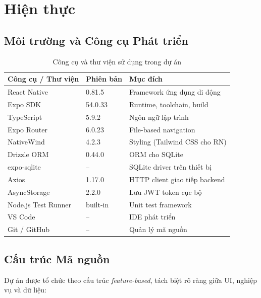 \chapter{Hiện thực}
\label{chap:implementation}

\section{Môi trường và Công cụ Phát triển}
\label{sec:impl-env}

\begin{table}[H]
  \centering
  \caption{Công cụ và thư viện sử dụng trong dự án}
  \label{tab:impl-tools}
  \begin{tabular}{lll}
    \toprule
    \textbf{Công cụ / Thư viện} & \textbf{Phiên bản} & \textbf{Mục đích} \\
    \midrule
    React Native         & 0.81.5  & Framework ứng dụng di động \\
    Expo SDK             & 54.0.33 & Runtime, toolchain, build \\
    TypeScript           & 5.9.2   & Ngôn ngữ lập trình \\
    Expo Router          & 6.0.23  & File-based navigation \\
    NativeWind           & 4.2.3   & Styling (Tailwind CSS cho RN) \\
    Drizzle ORM          & 0.44.0  & ORM cho SQLite \\
    expo-sqlite          & --      & SQLite driver trên thiết bị \\
    Axios                & 1.17.0  & HTTP client giao tiếp backend \\
    AsyncStorage         & 2.2.0   & Lưu JWT token cục bộ \\
    Node.js Test Runner  & built-in & Unit test framework \\
    VS Code              & --      & IDE phát triển \\
    Git / GitHub         & --      & Quản lý mã nguồn \\
    \bottomrule
  \end{tabular}
\end{table}

\section{Cấu trúc Mã nguồn}
\label{sec:impl-structure}

Dự án được tổ chức theo cấu trúc \textit{feature-based},
tách biệt rõ ràng giữa UI, nghiệp vụ và dữ liệu:

